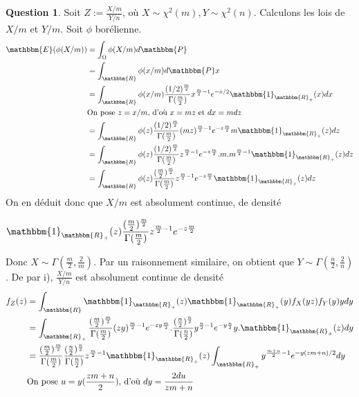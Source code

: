 \documentclass[12pt]{article}
\newcommand{\R}{\mathbbm{R}}
\newcommand{\1}{\mathbbm{1}}
\newcommand{\E}{\mathbbm{E}}
\newcommand{\Prob}{\mathbbm{P}}
\theoremstyle{definition}\newtheorem{defn}{Définition}
\theoremstyle{definition}\newtheorem{exm}{Exemple}
\theoremstyle{definition}\newtheorem{rem}{Remarque}
\theoremstyle{definition}\newtheorem{algo}{Algorithme}
\theoremstyle{remark}\newtheorem{exo}{Exercice}
\theoremstyle{remark}\newtheorem{nota}{Notation}
\theoremstyle{definition}\newtheorem{1q}{Question}
\theoremstyle{definition}\newtheorem{2q}{Question}
\theoremstyle{definition}\newtheorem{3q}{Question}
\theoremstyle{definition}\newtheorem{4q}{Question}
\theoremstyle{definition}\newtheorem{2qs1}{}
\theoremstyle{definition}\newtheorem{2qs2}{}
\theoremstyle{definition}\newtheorem{2qs3}{}
\theoremstyle{definition}\newtheorem{2qs4}{}
\theoremstyle{definition}\newtheorem{4qs2}{}
\theoremstyle{definition}\newtheorem{4qs3}{}
\begin{document}
\begin{3q}
Soit $Z := \displaystyle\frac{X/m}{Y/n}$, où $X\sim \chi^2(m), Y\sim\chi^2(n)$. \newline
Calculons les lois de $X/m$ et $Y/m$. Soit $\phi$ borélienne. \newline
\begin{align*}
\E(\phi(X/m)) &= \int_{\Omega}\phi(X/m)d\Prob \\
&= \int_\R \phi(x/m)d\Prob x\\
&= \int_\R  \phi(x/m) \frac{(1/2)^{\frac{m}{2}}}{\Gamma(\frac{m}{2})}x^{\frac{m}{2} - 1}e^{-x/2}\1_{\R_+}(x)dx\\
& \text{On pose $z = x/m$, d'où $x=mz$ et $dx = mdz$ }\\
&= \int_\R  \phi(z) \frac{(1/2)^{\frac{m}{2}}}{\Gamma(\frac{m}{2})}(mz)^{\frac{m}{2} - 1}e^{-z\frac{m}{2}}m\1_{\R_+}(z)dz\\
&= \int_\R  \phi(z) \frac{(1/2)^{\frac{m}{2}}}{\Gamma(\frac{m}{2})}z^{\frac{m}{2}-1}e^{-z\frac{m}{2}}.m.m^{\frac{m}{2} -1}\1_{\R_+}(z)dz\\
&= \int_\R  \phi(z) \frac{(\frac{m}{2})^{\frac{m}{2}}}{\Gamma(\frac{m}{2})}z^{\frac{m}{2}-1}e^{-z\frac{m}{2}}\1_{\R_+}(z)dz
\end{align*}
On en déduit donc que $X/m$ est absolument continue, de densité
\begin{center} $\displaystyle\1_{\R_+}(z)\frac{(\frac{m}{2})^{\frac{m}{2}}}{\Gamma(\frac{m}{2})}z^{\frac{m}{2}-1}e^{-z\frac{m}{2}} $\end{center}
Donc $X\sim \Gamma(\frac{m}{2}, \frac{2}{m})$. \newline
Par un raisonnement similaire, on obtient que $Y\sim\Gamma(\frac{n}{2},\frac{2}{n})$.\newline
De par i), $\frac{X/m}{Y/n}$ est absolument continue de densité 
 \begin{align*}
f_Z(z) &= \int_{\R}\1_{\R_+}(z)\1_{\R_+}(y)f_X(yz)f_Y(y)ydy \\
&= \int_{\R_+} \frac{(\frac{m}{2})^{\frac{m}{2}}}{\Gamma(\frac{m}{2})}(zy)^{\frac{m}{2}-1}e^{-zy\frac{m}{2}}.\frac{(\frac{n}{2})^{\frac{n}{2}}}{\Gamma(\frac{n}{2})}y^{\frac{n}{2}-1}e^{-y\frac{n}{2}}y.\1_{\R_+}(z)dy\\
&= \frac{(\frac{m}{2})^{\frac{m}{2}}}{\Gamma(\frac{m}{2})} \frac{(\frac{n}{2})^{\frac{n}{2}}}{\Gamma(\frac{n}{2})} z^{\frac{m}{2}-1}\1_{\R_+}(z)\int_{\R_+} y^{\frac{m+n}{2}-1}e^{-y(zm+n)/2}dy\\
& \text{On pose $u = y(\frac{zm+n}{2})$, d'où $dy = \frac{2du}{zm+n}$}\\

\end{align*}
\end{3q}
\end{document}
